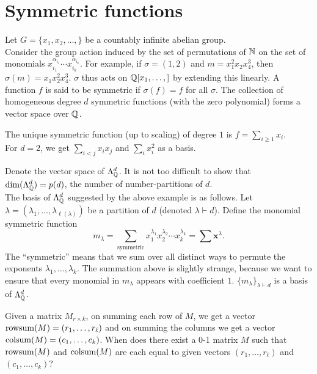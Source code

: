 \section{Symmetric functions}

	Let $G = \{x_1,x_2,\ldots,\}$ be a countably infinite abelian group.\\ 
	Consider the group action induced by the set of permutations of $\mathbb{N}$ on the set of monomials $x_{i_1}^{\alpha_{i_1}}\cdots x_{i_k}^{\alpha_{i_k}}$. For example,
	if $\sigma = (1,2)$ and $m = x_1^2x_2x_4^3$, then $\sigma(m) = x_1x_2^2x_4^3$.
	$\sigma$ thus acts on $\mathbb{Q}[x_1,\ldots,]$ by extending this linearly. A function $f$ is said to be symmetric if $\sigma(f) = f$ for all $\sigma$. The collection of homogeneous degree $d$ symmetric functions (with the zero polynomial) forms a vector space over $\mathbb{Q}$.

	\begin{fex}
		The unique symmetric function (up to scaling) of degree $1$ is $f = \sum_{i \ge 1} x_i$.\\
		For $d=2$, we get $\sum_{i<j} x_ix_j$ and $\sum_i x_i^2$ as a basis.
	\end{fex}

	Denote the vector space of $\Lambda_{\mathbb{Q}}^d$. It is not too difficult to show that $\dim(\Lambda_{\mathbb{Q}}^d) = p(d)$, the number of number-partitions of $d$.\\
	The basis of $\Lambda_{\mathbb{Q}}^d$ suggested by the above example is as follows. Let $\lambda = (\lambda_1,\ldots,\lambda_{\ell(\lambda)})$ be a partition of $d$ (denoted $\lambda \vdash d$). Define the monomial symmetric function
	\[ m_\lambda = \sum_{\text{symmetric}} x_1^{\lambda_1} x_2^{\lambda_2} \cdots x_k^{\lambda_k} = \sum \textbf{x}^\lambda. \]
	The ``symmetric'' means that we sum over all distinct ways to permute the exponents $\lambda_1,\ldots,\lambda_k$. The summation above is slightly strange, because we want to ensure that every monomial in $m_\lambda$ appears with coefficient $1$. $\{m_\lambda\}_{\lambda \vdash d}$ is a basis of $\Lambda_{\mathbb{Q}}^d$.

	\begin{question}
		\label{question: rowsum colsum}
		Given a matrix $M_{r \times k}$, on summing each row of $M$, we get a vector $\operatorname{rowsum}(M) = (r_1,\ldots,r_\ell)$ and on summing the columns we get a vector $\operatorname{colsum}(M) = (c_1,\ldots,c_k)$. When does there exist a 0-1 matrix $M$ such that $\operatorname{rowsum}(M)$ and $\operatorname{colsum}(M)$ are each equal to given vectors $(r_1,\ldots,r_\ell)$ and $(c_1,\ldots,c_k)$?
	\end{question}

